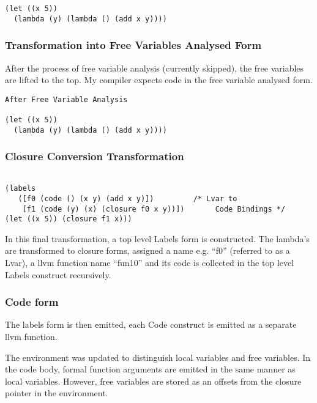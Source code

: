 \documentclass{article}
\begin{document}
\begin{verbatim}
(let ((x 5))
  (lambda (y) (lambda () (add x y))))
\end{verbatim}

\subsubsection{Transformation into Free Variables Analysed Form}

After the process of free variable analysis (currently skipped), the free variables are lifted to the top. My compiler expects code in the free variable analysed form. 

\begin{verbatim}
After Free Variable Analysis

(let ((x 5))
  (lambda (y) (lambda () (add x y))))
\end{verbatim}

\subsubsection{Closure Conversion Transformation}

\begin{verbatim}

(labels 
   ([f0 (code () (x y) (add x y)])         /* Lvar to 
    [f1 (code (y) (x) (closure f0 x y))])       Code Bindings */
(let ((x 5)) (closure f1 x)))
\end{verbatim}

In this final transformation, a top level Labels form is constructed. The lambda's are transformed to closure forms, assigned a name e.g. ``f0'' (referred to as a Lvar), a llvm function name ``fun10'' and its code is collected in the top level Labels construct recursively.

\subsubsection{Code form}

The labels form is then emitted, each Code construct is emitted as a separate llvm function.

The environment was updated to distinguish local variables and free variables. In the code body, formal function arguments are emitted in the same manner as local variables. However, free variables are stored as an offsets from the closure pointer in the environment.
\end{document}
